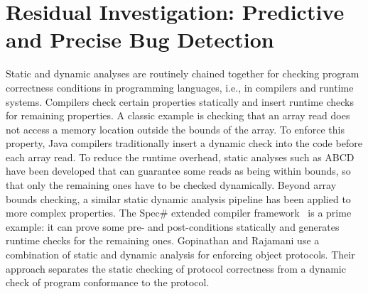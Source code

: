 \section{Residual Investigation: Predictive and Precise Bug Detection}


Static and dynamic analyses are routinely chained together for
checking program correctness conditions in programming languages,
i.e., in compilers and runtime systems. Compilers check certain
properties statically and insert runtime checks for remaining
properties. A classic example is checking that an array read does not
access a memory location outside the bounds of the array. To enforce
this property, Java compilers traditionally insert a dynamic check
into the code before each array read. To reduce the runtime overhead,
static analyses such as ABCD~\cite{bodik00abcd} have been developed
that can guarantee some reads as being within bounds, so that only the
remaining ones have to be checked dynamically. Beyond array
bounds checking, a similar static dynamic analysis pipeline has been
applied to more complex properties. The Spec\# extended compiler
framework~\cite{barnett04spec} is a prime example: it can prove some
pre- and post-conditions statically and generates runtime checks for
the remaining ones. 
Gopinathan and Rajamani \cite{Gopinathan:2008:EOP:1449764.1449784} use a combination of static
and dynamic analysis for enforcing object protocols. Their approach
separates the static checking of protocol correctness from a
dynamic check of program conformance to the protocol.

